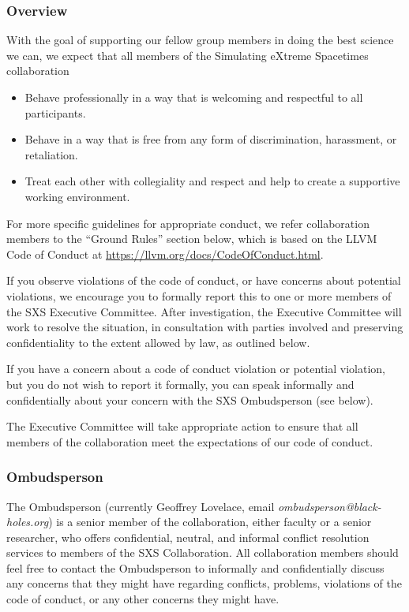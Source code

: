 \subsubsection{Overview} 
With the goal of supporting our fellow group members in doing the best
science we can, we expect that all members of the Simulating eXtreme
Spacetimes collaboration
\begin{itemize} 
\item Behave professionally in a way that is welcoming and respectful
  to all participants.
\item Behave in a way that is free from any form of discrimination,
  harassment, or retaliation.
\item Treat each other with collegiality and respect and help to
  create a supportive working environment.
\end{itemize}
For more specific guidelines for appropriate conduct, we refer
collaboration members to the “Ground Rules” section below, which is
based on the LLVM Code of Conduct at
\url{https://llvm.org/docs/CodeOfConduct.html}.

If you observe violations of the code of conduct, or have concerns about
potential violations, we encourage you to formally report this to one or more
members of the SXS Executive Committee. After investigation, the Executive
Committee will work to resolve the situation, in consultation with parties
involved and preserving confidentiality to the extent allowed by law, as
outlined below. 

If you have a concern about a code of conduct violation or potential
violation, but you do not wish to report it formally, you can speak
informally and confidentially about your concern with the SXS
Ombudsperson (see below).

The Executive Committee will take appropriate action to ensure that
all members of the collaboration meet the expectations of our code of
conduct.

\subsubsection{Ombudsperson}
The Ombudsperson (currently Geoffrey Lovelace, email
\emph{ombudsperson@black-holes.org}) is a senior member of the collaboration, 
either faculty or a senior researcher, who offers confidential, neutral, and
informal conflict resolution services to members of the SXS
Collaboration. All collaboration members should feel free to contact
the Ombudsperson to informally and confidentially discuss any concerns
that they might have regarding conflicts, problems, violations of the
code of conduct, or any other concerns they might have.

